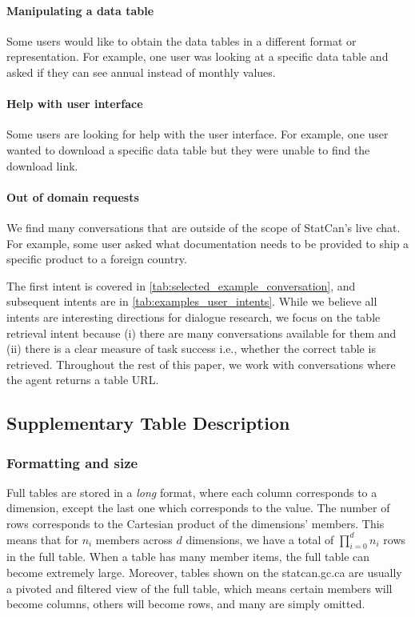\documentclass[11pt]{article}
\begin{document}
\paragraph{Manipulating a data table} Some users would like to obtain the data tables in a different format or representation. For example, one user was looking at a specific data table and asked if they can see annual instead of monthly values. 

\paragraph{Help with user interface} Some users are looking for help with the user interface. For example, one user wanted to download a specific data table but they were unable to find the download link. 

\paragraph{Out of domain requests} We find many conversations that are outside of the scope of StatCan's live chat. For example, some user asked what documentation needs to be provided to ship a specific product to a foreign country. 
\newline

The first intent is covered in \autoref{tab:selected_example_conversation}, and subsequent intents are in \autoref{tab:examples_user_intents}. While we believe all intents are interesting directions for dialogue research, we focus on the table retrieval intent because (i) there are many conversations available for them and (ii) there is a clear measure of task success i.e., whether the correct table is retrieved. Throughout the rest of this paper, we work with conversations where the agent returns a table URL. 


\subsection{Supplementary Table Description}

\subsubsection{Formatting and size}
\label{sec:appendix_formatting_size}
Full tables are stored in a \textit{long} format, where each column corresponds to a dimension, except the last one which corresponds to the value. The number of rows corresponds to the Cartesian product of the dimensions' members. This means that for $n_i$ members across $d$ dimensions, we have a total of $\prod_{i=0}^{d} n_i$ rows in the full table. When a table has many member items, the full table can become extremely large. Moreover, tables shown on the statcan.gc.ca are usually a pivoted and filtered view of the full table, which means certain members will become columns, others will become rows, and many are simply omitted.
\end{document}
